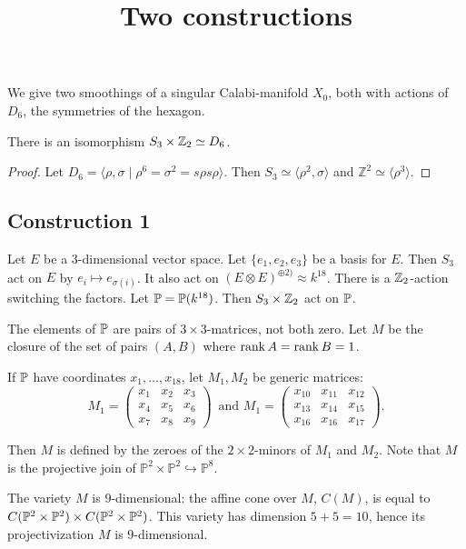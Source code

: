 \documentclass[11pt, english]{article}
\begin{document}
\title{Two constructions}
\date{}
\maketitle

We give two smoothings of a singular Calabi-manifold $X_0$, both with actions of $D_6$, the symmetries of the hexagon.

\begin{lemma}
There is an isomorphism $S_3 \times \mathbb{Z}_2 \simeq D_6$.
\end{lemma}
\begin{proof}
Let $D_6 = \langle \rho, \sigma \mid \rho^6=\sigma^2=s\rho s \rho \rangle$. Then $S_3 \simeq \langle \rho^2, \sigma \rangle $ and $\mathbb Z^2 \simeq \langle \rho ^3 \rangle$.
\end{proof}

\subsection{Construction 1}

Let $E$ be a 3-dimensional vector space. Let $\{e_1,e_2,e_3\}$ be a basis for $E$. Then $S_3$ act on $E$ by $e_i \mapsto e_{\sigma(i)}$. It also act on $(E \otimes E)^{\oplus 2)}\approx k^{18}$. There is a $\mathbb{Z}_2$-action switching the factors. Let $\mathbb{P}=\mathbb{P}(k^{18})$. Then $S_3 \times \mathbb{Z}_2$ act on $\mathbb{P}$. 

The elements of $\mathbb{P}$ are pairs of $3 \times 3$-matrices, not both zero. Let $M$ be the closure of the set of pairs $(A,B)$ where $\operatorname{\mathrm{rank}} A = \operatorname{\mathrm{rank}} B = 1$. 

If $\mathbb{P}$ have coordinates $x_1,\ldots,x_{18}$, let $M_1, M_2$ be generic matrices:
\[
M_1 = \begin{pmatrix}
x_1 & x_2 & x_3 \\
x_4 & x_5 & x_6 \\
x_7 & x_8 & x_9 
\end{pmatrix}\,
\text{ and }
M_1 = \begin{pmatrix}
x_{10} & x_{11} & x_{12} \\
x_{13} & x_{14} & x_{15} \\
x_{16} & x_{16} & x_{17}
\end{pmatrix}.
\]

Then $M$ is defined by the zeroes of the $2 \times 2$-minors of $M_1$ and $M_2$. Note that $M$ is the projective join of $\mathbb P^2 \times \mathbb P^2 \hookrightarrow \mathbb P^8$. 

The variety $M$ is $9$-dimensional: the affine cone over $M$, $C(M)$, is equal to $C(\mathbb P^2 \times \mathbb{P}^2) \times C(\mathbb P^2 \times \mathbb{P}^2)$. This variety has dimension $5+5=10$, hence its projectivization $M$ is $9$-dimensional. 
\end{document}
